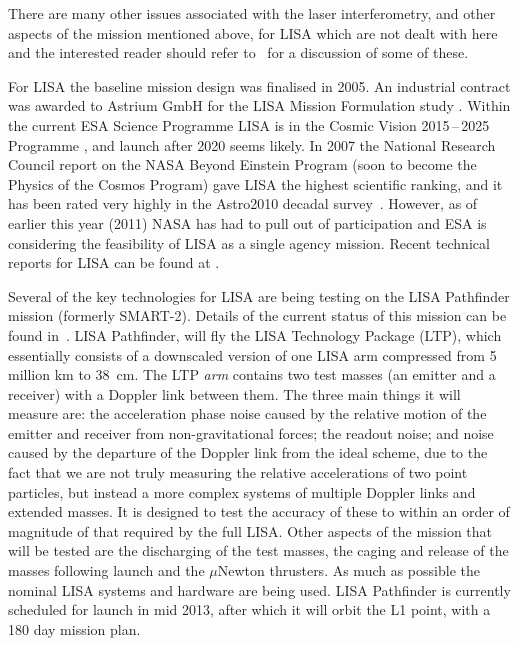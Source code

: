 \documentclass{article}
\begin{document}
There are many other issues associated with the laser interferometry, and other
aspects of the mission mentioned above, for LISA which are not dealt with here
and the interested reader should refer to~\cite{Houghetal, Jennrich:2009,
Johann:2008} for a discussion of some of these.

For LISA the baseline mission design was finalised in 2005. An industrial
contract was awarded to Astrium GmbH for the LISA Mission Formulation study
\cite{Johann:2008}. Within the current ESA Science Programme LISA is in the
Cosmic Vision 2015\,--\,2025 Programme \cite{ESACosmicVisions}, and launch after
2020 seems likely. In 2007 the National Research Council report on the NASA
Beyond Einstein Program (soon to become the Physics of the Cosmos Program) gave
LISA the highest scientific ranking, and it has been rated very highly in the
Astro2010 decadal survey~\cite{astro2010}. However, as of earlier this year
(2011) NASA has had to pull out of participation and ESA is considering the
feasibility of LISA as a single agency mission. Recent technical reports for
LISA can be found at \cite{LISATechReports}.

Several of the key technologies for LISA are being testing on the LISA
Pathfinder mission (formerly SMART-2). Details of the current status of this
mission can be found in~\cite{Armano:2009}. LISA Pathfinder, will fly the LISA
Technology Package (LTP), which essentially consists of a downscaled version of
one LISA arm compressed from 5 million km to 38~cm. The LTP \textit{arm} contains
two test masses (an emitter and a receiver) with a Doppler link between them.
The three main things it will measure are: the acceleration phase noise caused
by the relative motion of the emitter and receiver from non-gravitational
forces; the readout noise; and noise caused by the departure of the Doppler link
from the ideal scheme, due to the fact that we are not truly measuring the
relative accelerations of two point particles, but instead a more complex
systems of multiple Doppler links and extended masses. It is designed to test
the accuracy of these to within an order  of magnitude of that required by
the full LISA. Other aspects of the mission that will be tested are the
discharging of the test masses, the caging and release of the masses following
launch and the $\mu$Newton thrusters. As much as possible the nominal LISA
systems and hardware are being used. LISA Pathfinder is currently scheduled for
launch in mid 2013, after which it will orbit the L1 point, with a 180 day
mission plan.
\end{document}
